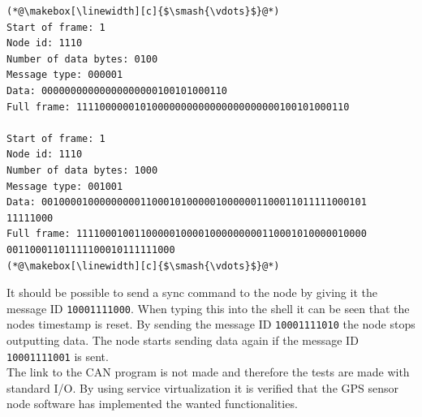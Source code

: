 \begin{lstlisting}[caption=Struct for data packet.,label=code:output_node]
(*@\makebox[\linewidth][c]{$\smash{\vdots}$}@*)
Start of frame: 1
Node id: 1110
Number of data bytes: 0100
Message type: 000001
Data: 00000000000000000000100101000110
Full frame: 11110000001010000000000000000000000100101000110

Start of frame: 1
Node id: 1110
Number of data bytes: 1000
Message type: 001001
Data: 00100001000000000110001010000010000001100011011111000101 11111000
Full frame: 11110001001100000100001000000000110001010000010000 00110001101111100010111111000
(*@\makebox[\linewidth][c]{$\smash{\vdots}$}@*)
\end{lstlisting}

It should be possible to send a sync command to the node by giving it the message ID \texttt{10001111000}.
When typing this into the shell it can be seen that the nodes timestamp is reset.
By sending the message ID \texttt{10001111010} the node stops outputting data.
The node starts sending data again if the message ID \texttt{10001111001} is sent.\\

The link to the CAN program is not made and therefore the tests are made with standard I/O.
By using service virtualization it is verified that the GPS sensor node software has implemented the wanted functionalities.
